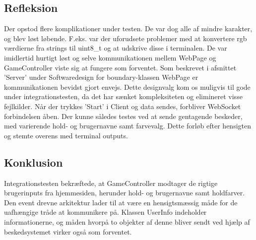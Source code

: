 \documentclass[Integrationstest/Integrationstest_main.tex]{subfiles}
\begin{document}
\subsection{Refleksion}
Der opstod flere komplikationer under testen. De var dog alle af mindre karakter, og blev løst løbende. F.eks. var der uforudsete problemer med at konvertere rgb værdierne fra strings til uint8\_t og at udskrive disse i terminalen. De var imidlertid hurtigt løst og selve kommunikationen mellem WebPage og GameController viste sig at fungere som forventet. Som beskrevet i afsnittet 'Server' under Softwaredesign for boundary-klassen WebPage er kommunikationen bevidst gjort envejs. Dette designvalg kom os muligvis til gode under integrationstesten, da det har sænket kompleksiteten og elimineret visse fejlkilder. Når der trykkes 'Start' i Client og data sendes, forbliver WebSocket forbindelsen åben. Der kunne således testes ved at sende gentagende beskeder, med varierende hold- og brugernavne samt farvevalg. Dette forløb efter hensigten og stemte overens med terminal outputs. 

\subsection{Konklusion}
Integrationstesten bekræftede, at GameController modtager de rigtige brugerinputs fra hjemmesiden, herunder hold- og brugernavne samt holdfarver. Den event drevne arkitektur lader til at være en hensigtsmæssig måde for de uafhængige tråde at kommunikere på. Klassen UserInfo indeholder informationerne, og måden hvorpå to objekter af denne bliver sendt ved hjælp af beskedsystemet virker også som forventet.
\end{document}
